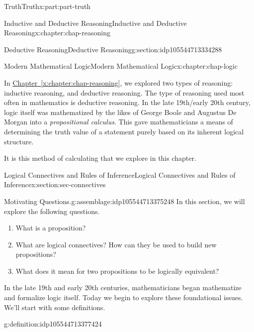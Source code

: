 \documentclass[oneside,10pt,]{book}
\newcommand{\xreffont}{\relax}
\numberwithin{equation}{section}
\begin{document}
\begin{partptx}{Truth}{}{Truth}{}{}{x:part:part-truth}
\begin{chapterptx}{Inductive and Deductive Reasoning}{}{Inductive and Deductive Reasoning}{}{}{x:chapter:chap-reasoning}
\begin{sectionptx}{Deductive Reasoning}{}{Deductive Reasoning}{}{}{g:section:idp105544713334288}
\end{sectionptx}
\end{chapterptx}
%
\typeout{************************************************}
\typeout{************************************************}
%
\begin{chapterptx}{Modern Mathematical Logic}{}{Modern Mathematical Logic}{}{}{x:chapter:chap-logic}
\begin{introduction}{}%
In \hyperref[x:chapter:chap-reasoning]{Chapter~{\xreffont\ref{x:chapter:chap-reasoning}}}, we explored two types of reasoning: inductive reasoning, and deductive reasoning. The type of reasoning used most often in mathematics is deductive reasoning. In the late 19th\slash{}early 20th century, logic itself was mathematized by the likes of George Boole and Augustus De Morgan into a \emph{propositional calculus}. This gave mathematicians a means of determining the truth value of a statement purely based on its inherent logical structure.%
\par
It is this method of calculating that we explore in this chapter.%
\end{introduction}%
%
%
\typeout{************************************************}
\typeout{************************************************}
%
\begin{sectionptx}{Logical Connectives and Rules of Inference}{}{Logical Connectives and Rules of Inference}{}{}{x:section:sec-connectives}
\begin{assemblage}{Motivating Questions.}{g:assemblage:idp105544713375248}%
In this section, we will explore the following questions. %
\begin{enumerate}
\item{}What is a proposition?%
\item{}What are logical connectives? How can they be used to build new propositions?%
\item{}What does it mean for two propositions to be logically equivalent?%
\end{enumerate}
%
\end{assemblage}
In the late 19th and early 20th centuries, mathematicians began mathematize and formalize logic itself. Today we begin to explore these foundational issues. We'll start with some definitions.%
\begin{definition}{}{g:definition:idp105544713377424}%
%
%
%

\end{definition}
\end{sectionptx}
\end{chapterptx}
\end{partptx}
\end{document}

